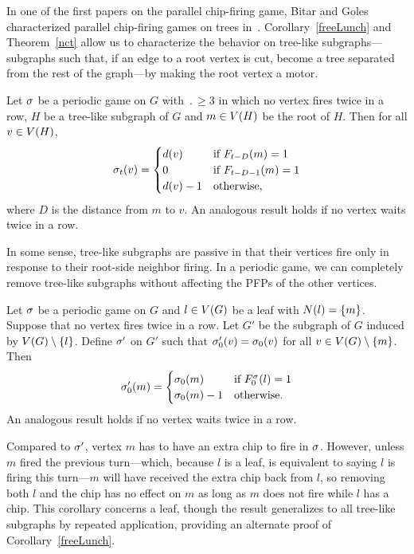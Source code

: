 In one of the first papers on the parallel chip-firing game, Bitar and Goles
characterized parallel chip-firing games on trees in~\cite{bitarGoles}.
Corollary~\ref{freeLunch} and Theorem~\ref{nct} allow us to characterize the
behavior on tree-like subgraphs---subgraphs such that, if an edge to a root
vertex is cut, become a tree separated from the rest of the graph---by making
the root vertex a motor.

\begin{cor}
Let $\s$ be a periodic game on $G$ with $\period \geq 3$ in which no vertex
fires twice in a row, $H$ be a tree-like subgraph of $G$ and $m \in \V[H]$ be
the root of $H$. Then for all $v \in \V[H]$,
\[
  \chips{v}{t} = \begin{cases}
    \deg{v} & \textnormal{if } \firing{m}{t-D} = 1 \\
    0 & \textnormal{if } \firing{m}{t-D-1} = 1 \\
    \deg{v} - 1 & \textnormal{otherwise},
  \end{cases}
\]
where $D$ is the distance from $m$ to $v$. An analogous result holds if no
vertex waits twice in a row.
\end{cor}

In some sense, tree-like subgraphs are passive in that their vertices fire only
in response to their root-side neighbor firing. In a periodic game, we can
completely remove tree-like subgraphs without affecting the PFPs of the other
vertices.

\begin{cor}
Let $\s$ be a periodic game on $G$ and $l \in \V$ be a leaf with $\N{l} =
\{m\}$. Suppose that no vertex fires twice in a row. Let $G'$ be the subgraph
of $G$ induced by $\V \setminus \{l\}$. Define $\s'$ on $G'$ such that
$\chips[\s']{v}{0} = \chips{v}{0}$ for all $v \in \V \setminus \{m\}$. Then
\[
  \chips[\s']{m}{0} = \begin{cases}
    \chips{m}{0} &\textnormal{if }\showhere{\firing{l}{0}} = 1 \\
    \chips{m}{0} - 1 &\textnormal{otherwise}.
  \end{cases}
\]
An analogous result holds if no vertex waits twice in a row.
\end{cor}

Compared to $\s'$, vertex $m$ has to have an extra chip to fire in $\s$.
However, unless $m$ fired the previous turn---which, because $l$ is a leaf, is
equivalent to saying $l$ is firing this turn---$m$ will have received the extra
chip back from $l$, so removing both $l$ and the chip has no effect on $m$ as
long as $m$ does not fire while $l$ has a chip. This corollary concerns a leaf,
though the result generalizes to all tree-like subgraphs by repeated
application, providing an alternate proof of Corollary~\ref{freeLunch}.
